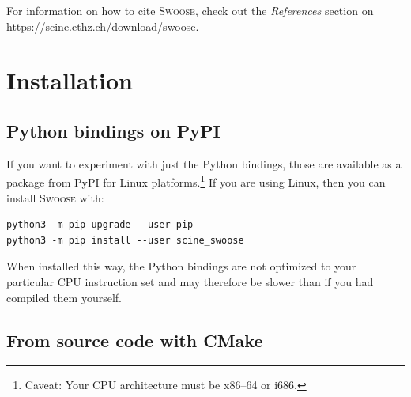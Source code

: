 \documentclass[]{tufte-book}
\begin{document}
For information on how to cite \textsc{Swoose}, check out the \textit{References} section on \href{https://scine.ethz.ch/download/swoose}{https://scine.ethz.ch/download/swoose}.

\enlargethispage{\baselineskip}

\chapter{Installation}\label{ch:installation}

\section{Python bindings on PyPI}
If you want to experiment with just the Python bindings, those are available as
a package from PyPI for Linux platforms.\footnote{Caveat: Your CPU architecture
must be x86--64 or i686.} If you are using Linux, then you can install
\textsc{Swoose} with:

\begin{mdframed}[backgroundcolor=LightSteelBlue!25, linewidth=0pt]
\begin{verbatim}
python3 -m pip upgrade --user pip
python3 -m pip install --user scine_swoose
\end{verbatim}
\end{mdframed}

When installed this way, the Python bindings are not optimized to your
particular CPU instruction set and may therefore be slower than if you had
compiled them yourself.

\section{From source code with CMake}
\end{document}
